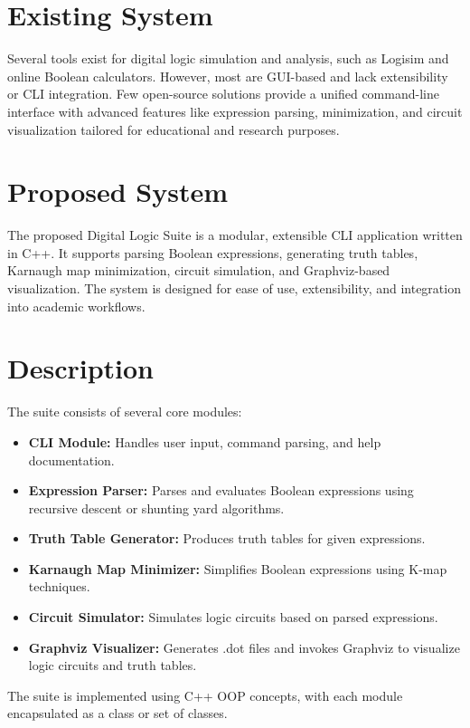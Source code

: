 \documentclass[a4paper,12pt]{article}
\begin{document}
\section{Existing System}
Several tools exist for digital logic simulation and analysis, such as Logisim and online Boolean calculators. However, most are GUI-based and lack extensibility or CLI integration. Few open-source solutions provide a unified command-line interface with advanced features like expression parsing, minimization, and circuit visualization tailored for educational and research purposes.

\section{Proposed System}
The proposed Digital Logic Suite is a modular, extensible CLI application written in C++. It supports parsing Boolean expressions, generating truth tables, Karnaugh map minimization, circuit simulation, and Graphviz-based visualization. The system is designed for ease of use, extensibility, and integration into academic workflows.

\section{Description}
The suite consists of several core modules:
\begin{itemize}
    \item \textbf{CLI Module:} Handles user input, command parsing, and help documentation.
    \item \textbf{Expression Parser:} Parses and evaluates Boolean expressions using recursive descent or shunting yard algorithms.
    \item \textbf{Truth Table Generator:} Produces truth tables for given expressions.
    \item \textbf{Karnaugh Map Minimizer:} Simplifies Boolean expressions using K-map techniques.
    \item \textbf{Circuit Simulator:} Simulates logic circuits based on parsed expressions.
    \item \textbf{Graphviz Visualizer:} Generates .dot files and invokes Graphviz to visualize logic circuits and truth tables.
\end{itemize}
The suite is implemented using C++ OOP concepts, with each module encapsulated as a class or set of classes.
\end{document}

